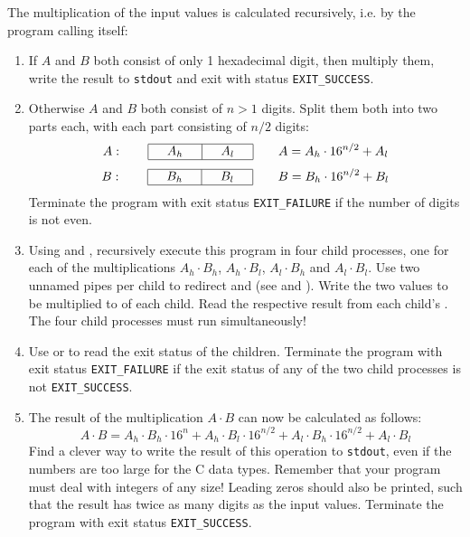 The multiplication of the input values is calculated recursively,
i.e. by the program calling itself:
\begin{enumerate}
\item If $A$ and $B$ both consist of only 1 hexadecimal digit, then multiply them,
write the result to \texttt{stdout} and exit with status \verb|EXIT_SUCCESS|.
\item Otherwise $A$ and $B$ both consist of $n>1$ digits. Split them both into two parts each,
with each part consisting of $n/2$ digits:
\renewcommand{\arraystretch}{1.3}
\[
A:\quad\quad\begin{array}{|c|c|}\hline \quad A_h \quad & \quad A_l \quad \\\hline\end{array}\quad\quad A=A_h\cdot 16^{n/2}+A_l
\]
\[
B:\quad\quad\begin{array}{|c|c|}\hline \quad B_h \quad & \quad B_l \quad \\\hline\end{array}\quad\quad B=B_h\cdot 16^{n/2}+B_l
\]
Terminate the program with exit status \verb|EXIT_FAILURE|
if the number of digits is not even.

\item Using  and ,
recursively execute this program in four child processes,
one for each of the multiplications $A_h\cdot B_h$, $A_h\cdot B_l$, $A_l\cdot B_h$ and  $A_l\cdot B_l$.
Use two unnamed pipes per child
to redirect  and 
(see  and ).
Write the two values to be multiplied to  of each child.
Read the respective result from each child's .
The four child processes must run simultaneously!

\item Use  or 
to read the exit status of the children.
Terminate the program with exit status \verb|EXIT_FAILURE|
if the exit status of any of the two child processes is not \verb|EXIT_SUCCESS|.

\item The result of the multiplication $A\cdot B$ can now be calculated as follows:
\[
A\cdot B=A_h\cdot B_h\cdot 16^n + A_h\cdot B_l\cdot 16^{n/2} + A_l\cdot B_h\cdot 16^{n/2} + A_l\cdot B_l
\]
Find a clever way to write the result of this operation to \texttt{stdout},
even if the numbers are too large for the C data types.
Remember that your program must deal with integers of any size!
Leading zeros should also be printed,
such that the result has twice as many digits as the input values.
Terminate the program with exit status \verb|EXIT_SUCCESS|.

\end{enumerate}

